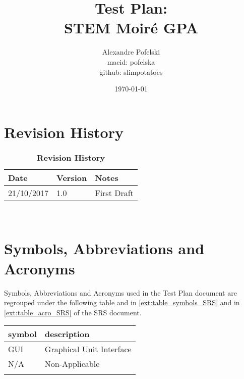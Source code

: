 \documentclass[12pt, titlepage]{article}
\begin{document}
\title{Test Plan:\\
		STEM Moir{\'e} GPA} 
\author{Alexandre Pofelski \\
		macid: pofelska \\
		github: slimpotatoes}
\date{\today}
	
\maketitle


\section{Revision History}

\begin{table}[h]
\caption{\bf Revision History}
\begin{tabularx}{\textwidth}{p{3cm}p{2cm}X}
\toprule {\bf Date} & {\bf Version} & {\bf Notes}\\
\midrule
21/10/2017 & 1.0 & First Draft\\
\bottomrule
\end{tabularx}
\end{table}

~\newpage

\section{Symbols, Abbreviations and Acronyms}
\label{symbols}

Symbols, Abbreviations and Acronyms used in the Test Plan document are regrouped under the following table and in \cref{ext:table_symbols_SRS} and in \cref{ext:table_acro_SRS} of the SRS document. \par\medskip

\renewcommand{\arraystretch}{1.2}
\begin{tabular}{l l} 
  \toprule		
  \textbf{symbol} & \textbf{description}\\
  \midrule 
  GUI & Graphical Unit Interface \\
  N/A & Non-Applicable \\
  \bottomrule
  \label{table_acro_Test_Plan}
\end{tabular}


\newpage

\tableofcontents

\listoftables

\listoffigures
\end{document}
